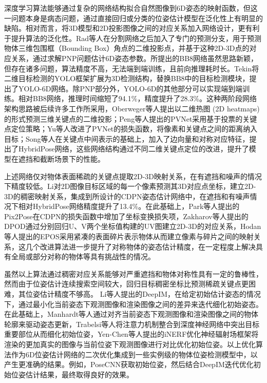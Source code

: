 \documentclass[12pt]{article}
\begin{document}
深度学习算法能够通过复杂的网络结构拟合自然图像到6D姿态的映射函数，但这一问题本身是病态问题，通过直接回归或分类的位姿估计模型在泛化性上有明显的缺陷。相对而言，将3D模型和2D投影图像之间的对应关系加入网络设计，更有利于提升算法的泛化性。Rad等人\cite{rad2017bb8}在分割网络之后加入了专门的预测分支，用于预测物体三维包围框（Bounding Box）角点的二维投影点，并基于这种2D-3D点的对应关系，通过求解PNP问题估计6D姿态参数。所提出的BB8网络\cite{rad2017bb8}虽然思路新颖，但存在诸多问题，算法精度不高，无法端到端训练，且前向推理耗时长。Tekin将二维目标检测的YOLO\cite{redmon2016yolo}框架扩展为3D检测结构，替换BB8中的目标检测模块，提出了YOLO-6D网络。除PNP部分外，YOLO-6D的其他部分可以实现端到端训练。相对BB8网络，推理时间缩短了94.1\%，精度提升了28.3\%。这种两阶段网络架构思路被后续许多工作所采用，Oberweger等人\cite{oberweger2018}提出以二维热图 (2D heatmaps) 的形式预测三维关键点的二维投影；Peng等人\cite{peng2019pvnet}提出的PVNet采用基于投票的关键点定位策略；Yu等人\cite{yu20206dof}改进了PVNet的损失函数，将像素和关键点之间的距离纳入目标；Song等人在关键点中间表示的基础上，加入了边向量和对称对应特征，提出了HybridPose\cite{song2020hybridpose}网络，这些网络结构通过不同二维关键点定位的改进，提升了模型在遮挡和截断场景下的性能。

上述网络仅对物体表面稀疏的关键点提取2D-3D映射关系，在有遮挡和噪声的情况下精度较低。Li对2D图像目标区域的每一个像素预测其3D对应点坐标，建立2D-3D的稠密映射关系，集成到所设计的CDPN\cite{li2019cdpn}姿态估计网络中，在遮挡和有噪声情况下相对HybridPose网络精度提升了13.4\%。在此基础上，Park等人提出的Pix2Pose\cite{park2019pix2pose}在CDPN的损失函数中增加了坐标变换损失项，Zakharov等人提出的DPOD\cite{zakharov2019dpod}通过分别回归U、V两个坐标值构建的UV图建立2D-3D的对应关系，Hodan等人提出的EPOS\cite{hodan2020epos}采用紧凑的表面碎片表示物体从而建立像素与碎片之间的映射关系，这几个改进算法进一步提升了对称物体的姿态估计精度，在一定程度上解决具有全局或部分对称的物体等具有挑战性的情况。


虽然以上算法通过稠密对应关系能够对严重遮挡和物体对称性具有一定的鲁棒性，然而由于位姿估计连续搜索空间较大，回归目标稠密坐标比预测稀疏关键点更困难，其位姿估计精度不够高。
Li等人提出的DeepIM\cite{li2018deepim}，在给定初始估计姿态的情况下，通过最小化当前姿态下观测图像和渲染图像之间的差异来迭代细化初始姿态。在此基础上，Manhardt等人\cite{manhardt2018deep}通过对齐当前姿态下观测图像和渲染图像之间的物体轮廓来驱动姿态更新，Trabelsi等人\cite{trabelsi2021pose}将注意力机制整合到深度神经网络中突出目标重要部位从而细化初始位姿，Yen-Chen等人\cite{yen2021inerf}提出的iNERF优化神经辐射场框架将渲染的更加真实的图像与当前位姿下观测图像进行对比优化初始位姿。以上优化算法作为6D位姿估计网络的二次优化集成到一些实例级的物体位姿检测模型中，以产生更准确的结果。例如，PoseCNN\cite{Xiang2018}获取初始位姿，然后结合DeepIM\cite{li2018deepim}迭代优化初始位姿估计结果，最终取得良好的效果。
\end{document}
